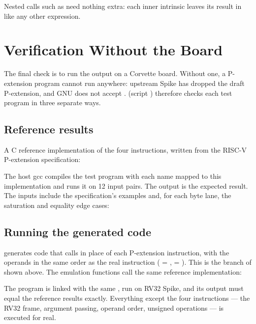 \documentclass[12pt]{article}
\begin{document}
Nested calls such as  need nothing extra: each
inner intrinsic leaves its result in  like any other expression.

\section{Verification Without the Board}
\label{sec:verify}

The final check is to run the output on a Corvette board. Without one, a P-extension program cannot run
anywhere: upstream Spike has dropped the draft P-extension, and GNU  does not accept
.  (script ) therefore checks each test program in
three separate ways.

\subsection{Reference results}

A C reference implementation of the four instructions, written from the RISC-V P-extension specification:


The host gcc compiles the test program with each  name mapped to this implementation and runs it
on 12 input pairs. The output is the expected result. The inputs include the specification's examples and,
for each byte lane, the saturation and equality edge cases:


\subsection{Running the generated code}

 generates code that calls  in place of each
P-extension instruction, with the operands in the same order as the real instruction
( = ,  = ). This is the  branch of 
shown above. The emulation functions call the same reference implementation:


The program is linked with the same , run on RV32 Spike, and its output must equal the
reference results exactly. Everything except the four instructions --- the RV32 frame, argument passing,
operand order, unsigned operations --- is executed for real.
\end{document}
